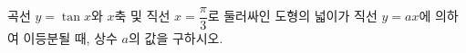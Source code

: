 \hspace*{2mm}\begin{minipage}[t]{\dimexpr\linewidth-2mm\relax}\vspace{0pt}
곡선 $y=\tan x$와 $x$축 및 직선 $x=\dfrac{\pi}{3}$로 둘러싸인 도형의 넓이가 직선 $y=ax$에 의하여 이등분될 때, 상수 $a$의 값을 구하시오. \end{minipage}
